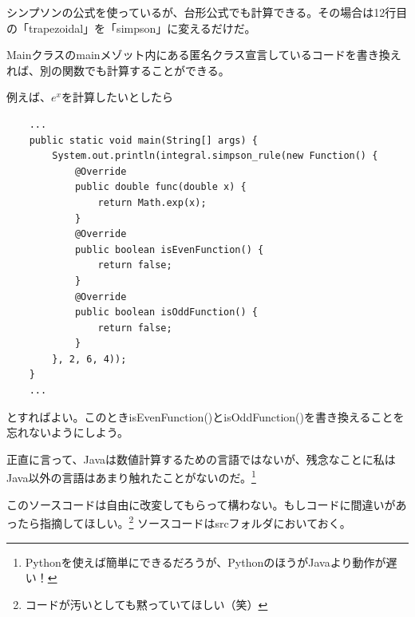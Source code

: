 \documentclass[a4j,dvipdfmx]{jsarticle}
\begin{document}
シンプソンの公式を使っているが、台形公式でも計算できる。その場合は12行目の「trapezoidal」を「simpson」に変えるだけだ。

Mainクラスのmainメゾット内にある匿名クラス宣言しているコードを書き換えれば、別の関数でも計算することができる。

例えば、$e^x$を計算したいとしたら

\begin{lstlisting}
    ...
    public static void main(String[] args) {
        System.out.println(integral.simpson_rule(new Function() {
            @Override
            public double func(double x) {
                return Math.exp(x);
            }   
            @Override
            public boolean isEvenFunction() {
                return false;
            }
            @Override
            public boolean isOddFunction() {
                return false;
            }
        }, 2, 6, 4));
    }
    ...
\end{lstlisting}
とすればよい。このときisEvenFunction()とisOddFunction()を書き換えることを忘れないようにしよう。

正直に言って、Javaは数値計算するための言語ではないが、残念なことに私はJava以外の言語はあまり触れたことがないのだ。\footnote{Pythonを使えば簡単にできるだろうが、PythonのほうがJavaより動作が遅い！}

このソースコードは自由に改変してもらって構わない。もしコードに間違いがあったら指摘してほしい。\footnote{コードが汚いとしても黙っていてほしい（笑）}
ソースコードはsrcフォルダにおいておく。
\end{document}
